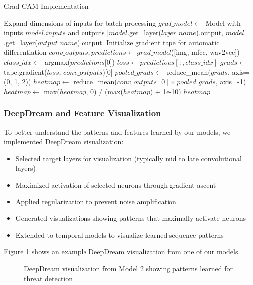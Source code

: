 \documentclass[conference,compsoc]{IEEEtran}
\begin{document}
\begin{algorithm}
\caption{Grad-CAM Implementation}
\label{alg:gradcam}
\begin{algorithmic}[1]
    \State Expand dimensions of inputs for batch processing
    \State $grad\_model \gets$ Model with inputs $model.inputs$ and outputs [$model$.get\_layer($layer\_name$).output, $model$.get\_layer($output\_name$).output]
    \State Initialize gradient tape for automatic differentiation
    \State $conv\_outputs, predictions \gets grad\_model$([img, mfcc, wav2vec])
        \State $class\_idx \gets$ argmax($predictions$[0])
    \EndIf
    \State $loss \gets predictions[:, class\_idx]$
    \State $grads \gets$ tape.gradient($loss$, $conv\_outputs$)[0]
    \State $pooled\_grads \gets$ reduce\_mean($grads$, axis=(0, 1, 2))
    \State $heatmap \gets$ reduce\_mean($conv\_outputs[0] \times pooled\_grads$, axis=-1)
    \State $heatmap \gets$ max($heatmap$, 0) / (max($heatmap$) + 1e-10)
    \State \Return $heatmap$
\EndFunction
\end{algorithmic}
\end{algorithm}

\subsubsection{DeepDream and Feature Visualization}
To better understand the patterns and features learned by our models, we implemented DeepDream visualization:
\begin{itemize}
    \item Selected target layers for visualization (typically mid to late convolutional layers)
    \item Maximized activation of selected neurons through gradient ascent
    \item Applied regularization to prevent noise amplification
    \item Generated visualizations showing patterns that maximally activate neurons
    \item Extended to temporal models to visualize learned sequence patterns
\end{itemize}

Figure \ref{fig:deepdream} shows an example DeepDream visualization from one of our models.

\begin{figure}[htbp]
\centering
\begin{minipage}{0.8\textwidth}
\end{minipage}
\caption{DeepDream visualization from Model 2 showing patterns learned for threat detection}
\label{fig:deepdream}
\end{figure}
\end{document}
